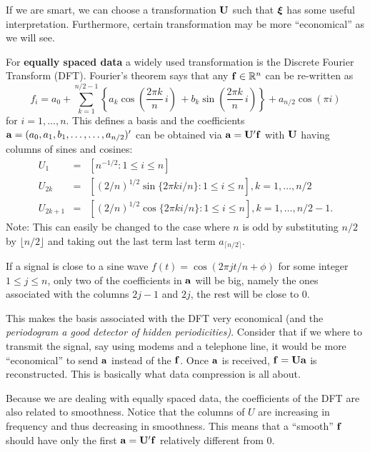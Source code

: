 If we are smart, we can choose a transformation ${\mathbf U}$ such that $\mbox{\boldmath $\xi$\unboldmath}$
has some useful interpretation. Furthermore, certain
transformation may be more ``economical'' as we will see.

For {\bf equally spaced data} a widely used transformation is the 
Discrete Fourier Transform (DFT).  Fourier's theorem says that any ${\mathbf f}
\in {\mathbb R}^n$  
can be re-written as 
\[
f_i = a_0 + \sum_{k=1}^{n/2 - 1} \left\{
  a_{k} \cos \left(\frac{2\pi k}{n}  \, i \right) \, 
  + b_{k} \sin \left(\frac{2 \pi k}{n} \,i \right) \right\} + a_{n/2}
  \cos (\pi i) 
\]
for $i=1,\dots,n$. This defines a basis and the coefficients ${\mathbf a} = 
(a_0,a_1,b_1,\dots,\dots,a_{n/2})'$ can be obtained via ${\mathbf a} = {\mathbf U}'
{\mathbf f}$ with ${\mathbf U}$ having columns of sines and cosines:
\begin{eqnarray*} 
  U_1 &=& [n^{-1/2}: 1 \leq i \leq n] \\
  U_{2k} &=& [(2/n)^{1/2}\sin\{2\pi k i/n\} : 1 \leq i \leq
  n], k=1,\dots,n/2 \\
  U_{2k+1} &=& [(2/n)^{1/2}\cos\{2\pi k i/n\} : 1 \leq i \leq
  n], k=1,\dots,n/2-1.
\end{eqnarray*}
Note: This can easily be changed to the case where $n$ is odd by
substituting $n/2$ by $\lfloor n/2 \rfloor$ and taking out the last
term last term $a_{\lceil n/2 \rceil}$.

If a signal is close to a sine wave $f(t) = \cos(2 \pi j t / n +
\phi)$ for some integer $1\leq j \leq n$, only 
two of the coefficients in ${\mathbf a}$ will be big, namely the ones associated with
the columns $2j-1$ and $2j$, the
rest will be close to 0. 

This makes the basis associated with the DFT very economical (and the
{\it periodogram a 
good detector of hidden periodicities)}. Consider that if we where to
transmit the 
signal, say using modems and a telephone line, it would be more
``economical'' to send ${\mathbf a}$ instead of 
the ${\mathbf f}$. Once ${\mathbf a}$ is received, ${\mathbf f}={\mathbf U}{\mathbf a}$ is reconstructed. This
is basically what data compression is all about.

Because we are dealing with equally spaced data, the coefficients of
the DFT are also related to smoothness. Notice that 
the columns of $U$ are increasing in frequency and thus decreasing in
smoothness. This means that a ``smooth'' ${\mathbf f}$ should have only the
first ${\mathbf a} = {\mathbf U}'{\mathbf f}$ 
relatively different 
from 0. 


\begin{figure}[htb]
\begin{center}
\end{center}
\end{figure}


